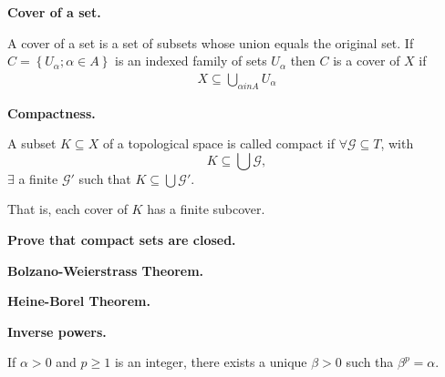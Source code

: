 \documentclass[12pt]{article}
\begin{document}
{\bf Cover of a set.}

A cover of a set is a set of subsets whose union equals the original set.  If $C = \left\{ U_{\alpha}; \alpha \in A \right\}$ is an indexed family of sets $U_{\alpha}$ then $C$ is a cover of $X$ if
\begin{align*}
  X \subseteq \bigcup_{\alpha in A} U_{\alpha}
\end{align*}

{\bf Compactness.}


A subset $K \subseteq X$ of a topological space is called compact if $\forall \mathcal{G} \subseteq T$, with 
\[
  K \subseteq \bigcup \mathcal{G},
  \]
  $\exists$ a finite $\mathcal{G}'$ such that $K \subseteq \bigcup \mathcal{G}'$.

  That is, each cover of $K$ has a finite subcover.

  {\bf Prove that compact sets are closed.}

  {\bf Bolzano-Weierstrass Theorem.}

  {\bf Heine-Borel Theorem.}

  {\bf Inverse powers.}

  If $\alpha > 0$ and $p \geq 1$ is an integer, there exists a unique $\beta > 0$ such tha $ \beta^p = \alpha$.
\end{document}
